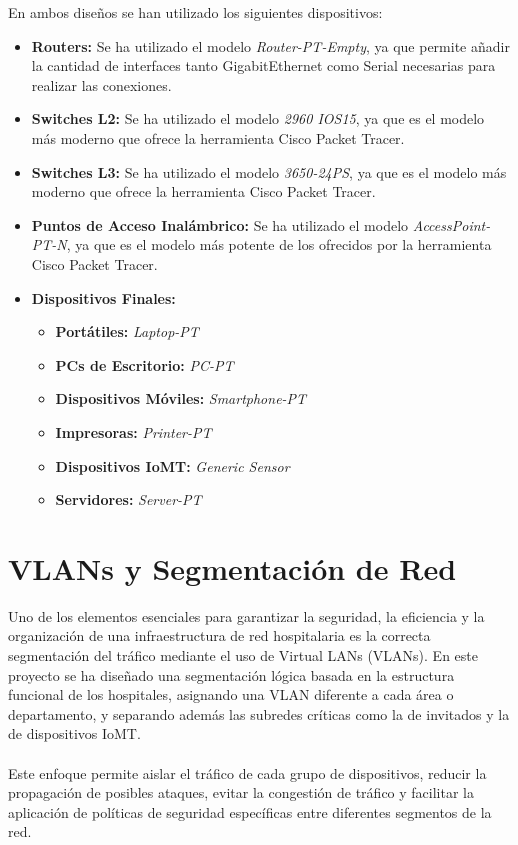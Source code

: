 En ambos diseños se han utilizado los siguientes dispositivos:
\begin{itemize}
    \item \textbf{Routers:} Se ha utilizado el modelo \textit{Router-PT-Empty}, ya que permite añadir la cantidad de interfaces tanto GigabitEthernet como Serial necesarias para realizar 
    las conexiones.
    \item \textbf{Switches L2:} Se ha utilizado el modelo \textit{2960 IOS15}, ya que es el modelo más moderno que ofrece la herramienta Cisco Packet Tracer.
    \item \textbf{Switches L3:} Se ha utilizado el modelo \textit{3650-24PS}, ya que es el modelo más moderno que ofrece la herramienta Cisco Packet Tracer.
    \item \textbf{Puntos de Acceso Inalámbrico:} Se ha utilizado el modelo \textit{AccessPoint-PT-N}, ya que es el modelo más potente de los ofrecidos por la herramienta Cisco Packet Tracer.
    \item \textbf{Dispositivos Finales:} 
    \begin{itemize}
        \item \textbf{Portátiles:} \textit{Laptop-PT}
        \item \textbf{PCs de Escritorio:} \textit{PC-PT}
        \item \textbf{Dispositivos Móviles:} \textit{Smartphone-PT}
        \item \textbf{Impresoras:} \textit{Printer-PT}
        \item \textbf{Dispositivos IoMT:} \textit{Generic Sensor}
        \item \textbf{Servidores:} \textit{Server-PT}
    \end{itemize}
\end{itemize}

\section{VLANs y Segmentación de Red}
Uno de los elementos esenciales para garantizar la seguridad, la eficiencia y la organización de una infraestructura de red hospitalaria es la correcta segmentación del 
tráfico mediante el uso de Virtual LANs (VLANs). En este proyecto se ha diseñado una segmentación lógica basada en la estructura funcional de los hospitales, asignando una 
VLAN diferente a cada área o departamento, y separando además las subredes críticas como la de invitados y la de dispositivos IoMT.
\\ \\
Este enfoque permite aislar el tráfico de cada grupo de dispositivos, reducir la propagación de posibles ataques, evitar la congestión de tráfico y facilitar la aplicación de 
políticas de seguridad específicas entre diferentes segmentos de la red.

